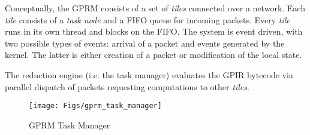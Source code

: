 \documentclass[copyright,creativecommons]{eptcs}
\begin{document}
Conceptually, the GPRM consists of a set of \emph{tiles} connected
over a network. Each \emph{tile} consists of a \emph{task node} and
a FIFO queue for incoming packets. Every \emph{tile} runs in its own
thread and blocks on the FIFO. The system is event driven, with two
possible types of events: arrival of a packet and events generated
by the kernel. The latter is either creation of a packet or modification
of the local state.

The reduction engine (i.e. the task manager) evaluates the GPIR bytecode
via parallel dispatch of packets requesting computations to other
\emph{tiles}. 

\begin{figure}


\begin{centering}
\texttt{[image: Figs/gprm\_task\_manager]}
\par\end{centering}

\caption{\label{fig:GPRM-Task-Manager}GPRM Task Manager}


\end{figure}
\end{document}
